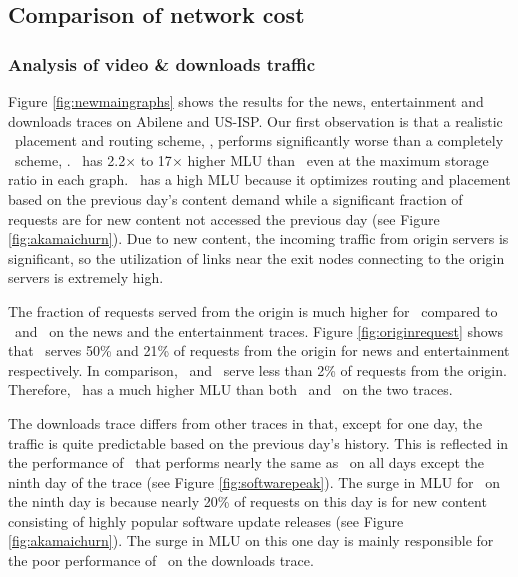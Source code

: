 \subsection{Comparison of network cost}

\subsubsection{Analysis of video \& downloads traffic}
\label{sec:videodownload}


Figure \ref{fig:newmaingraphs} shows the results for the news, entertainment and downloads traces on  Abilene and US-ISP. Our first observation is that a realistic \planned\  placement and routing scheme, \optrp, performs significantly worse than a completely \unplanned\  scheme, \invlru. \optrp\ has   2.2$\times$ to 17$\times$ higher MLU than \invlru\ even at the maximum storage ratio in each graph.  \optrp\ has a high MLU because it optimizes routing and placement based on the previous day's content demand while a significant fraction of requests are for new content not accessed the previous day (see Figure \ref{fig:akamaichurn}).  Due to new content, the incoming traffic from origin servers  is significant, so the utilization of links near the exit nodes connecting to the origin servers is extremely high. 


The fraction of requests served from the origin is much higher for \optrp\ compared to \invlru\ and \optrpfuture\  on the news and the entertainment traces. Figure  \ref{fig:originrequest} shows that  \optrp\  serves  50\% and 21\% of requests from the origin for news   and entertainment respectively. In comparison, \invlru\ and \optrpfuture\ serve less than 2\% of requests from the origin. Therefore, \optrp\ has a much higher MLU than both  \invlru\ and \optrpfuture\ on the two traces. 

The downloads trace differs from other traces in that, except for one day, the traffic is quite predictable based on the previous day's history. This is reflected in the performance of \optrp\ that performs nearly the same as \optrpfuture\ on all days except the ninth day of the trace (see Figure \ref{fig:softwarepeak}). The surge in MLU for \optrp\ on the ninth day is because nearly 20\% of requests on this day is for new content consisting of highly popular software update releases (see Figure \ref{fig:akamaichurn}). The surge in MLU on this one day is mainly responsible for the poor performance of \optrp\ on the downloads trace.

